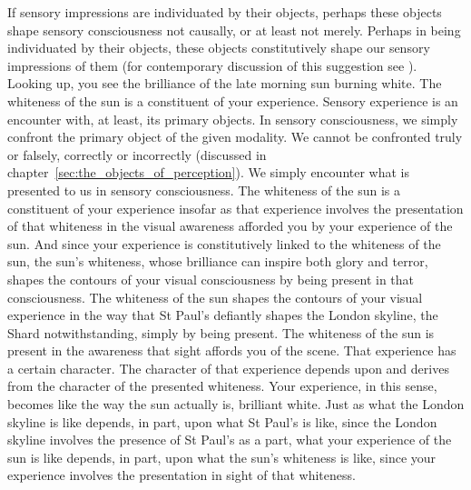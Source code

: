If sensory impressions are individuated by their objects, perhaps these objects shape sensory consciousness not causally, or at least not merely. Perhaps in being individuated by their objects, these objects constitutively shape our sensory impressions of them (for contemporary discussion of this suggestion see \citealt{McDowell:1998vn,Martin:2004fj,Fish:2009fk,Kalderon:2011fk}). Looking up, you see the brilliance of the late morning sun burning white. The whiteness of the sun is a constituent of your experience. Sensory experience is an encounter with, at least, its primary objects. In sensory consciousness, we simply confront the primary object of the given modality. We cannot be confronted truly or falsely, correctly or incorrectly (discussed in chapter~\ref{sec:the_objects_of_perception}). We simply encounter what is presented to us in sensory consciousness. The whiteness of the sun is a constituent of your experience insofar as that experience involves the presentation of that whiteness in the visual awareness afforded you by your experience of the sun. And since your experience is constitutively linked to the whiteness of the sun, the sun's whiteness, whose brilliance can inspire both glory and terror, shapes the contours of your visual consciousness by being present in that consciousness. The whiteness of the sun shapes the contours of your visual experience in the way that St Paul's defiantly shapes the London skyline, the Shard notwithstanding, simply by being present. The whiteness of the sun is present in the awareness that sight affords you of the scene. That experience has a certain character. The character of that experience depends upon and derives from the character of the presented whiteness. Your experience, in this sense, becomes like the way the sun actually is, brilliant white. Just as what the London skyline is like depends, in part, upon what St Paul's is like, since the London skyline involves the presence of St Paul's as a part, what your experience of the sun is like depends, in part, upon what the sun's whiteness is like, since your experience involves the presentation in sight of that whiteness.


